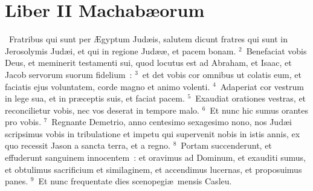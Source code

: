 {\centering \section*{Liber II Machabæorum}}\thispagestyle{empty}

~Fratribus qui sunt per \AE gyptum Jud\ae is, salutem dicunt fratres qui sunt in Jerosolymis Jud\ae i, et qui in regione Jud\ae \ae , et pacem bonam.
${}^{2}$~Benefaciat vobis Deus, et meminerit testamenti sui, quod locutus est ad Abraham, et Isaac, et Jacob servorum suorum fidelium~:
${}^{3}$~et det vobis cor omnibus ut colatis eum, et faciatis ejus voluntatem, corde magno et animo volenti.
${}^{4}$~Adaperiat cor vestrum in lege sua, et in pr\ae ceptis suis, et faciat pacem.
${}^{5}$~Exaudiat orationes vestras, et reconcilietur vobis, nec vos deserat in tempore malo.
${}^{6}$~Et nunc hic sumus orantes pro vobis.
${}^{7}$~Regnante Demetrio, anno centesimo sexagesimo nono, nos Jud\ae i scripsimus vobis in tribulatione et impetu qui supervenit nobis in istis annis, ex quo recessit Jason a sancta terra, et a regno.
${}^{8}$~Portam succenderunt, et effuderunt sanguinem innocentem~: et oravimus ad Dominum, et exauditi sumus, et obtulimus sacrificium et similaginem, et accendimus lucernas, et proposuimus panes.
${}^{9}$~Et nunc frequentate dies scenopegi\ae\ mensis Casleu.


